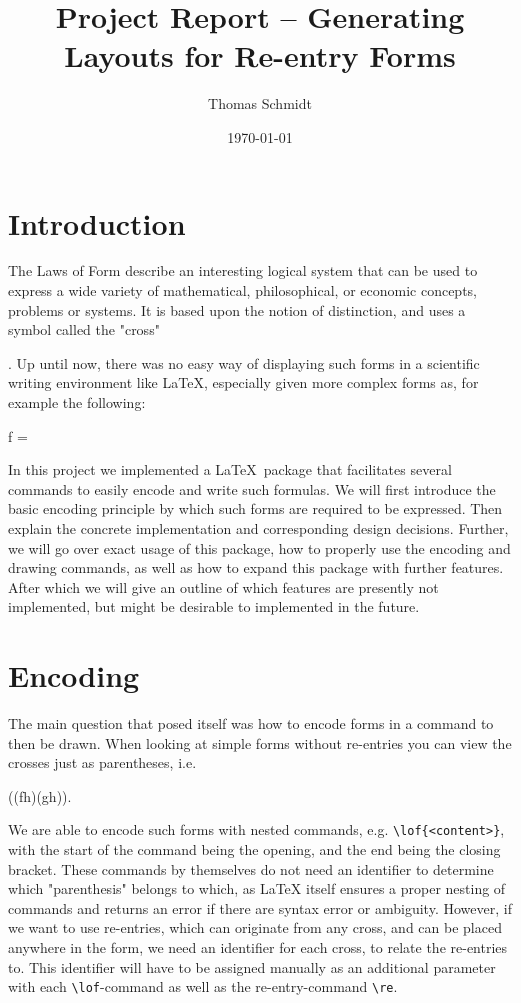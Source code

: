 \documentclass[12pt]{article}
\title{Project Report – Generating Layouts for Re-entry Forms}
\author{Thomas Schmidt}
\date{\today}
\begin{document}
\maketitle

\section{Introduction}\label{introduction}

The Laws of Form\cite{LoF} describe an interesting logical system that can be used to express a wide variety of mathematical, philosophical, or economic concepts, problems or systems. It is based upon the notion of distinction, and uses a symbol called the "cross"\begin{lofinline}\end{lofinline}. Up until now, there was no easy way of displaying such forms in a scientific writing environment like \LaTeX, especially given more complex forms as, for example the following:

\begin{lawofforms}
	f = 
\end{lawofforms}

In this project we implemented a \LaTeX~package that facilitates several commands to easily encode and write such formulas. We will first introduce the basic encoding principle by which such forms are required to be expressed. Then explain the concrete implementation and corresponding design decisions. Further, we will go over exact usage of this package, how to properly use the encoding and drawing commands, as well as how to expand this package with further features. After which we will give an outline of which features are presently not implemented, but might be desirable to implemented in the future.

\section{Encoding}\label{concept}

The main question that posed itself was how to encode forms in a command to then be drawn. When looking at simple forms without re-entries you can view the crosses just as parentheses, i.e.
\begin{lawofforms}
	\formdraw \equiv ((fh)(gh)).
\end{lawofforms}
We are able to encode such forms with nested commands, e.g. \texttt{\textbackslash lof\{<content>\}}, with the start of the command being the opening, and the end being the closing bracket. These commands by themselves do not need an identifier to determine which "parenthesis" belongs to which, as LaTeX itself ensures a proper nesting of commands and returns an error if there are syntax error or ambiguity. However, if we want to use re-entries, which can originate from any cross, and can be placed anywhere in the form, we need an identifier for each cross, to relate the re-entries to. This identifier will have to be assigned manually as an additional parameter with each \texttt{\textbackslash lof}-command as well as the re-entry-command \texttt{\textbackslash re}.
\end{document}
